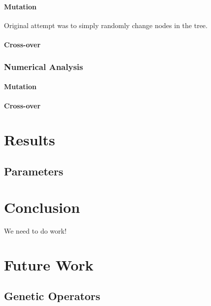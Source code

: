 \documentclass{acm_proc_article-sp}
\begin{document}
            \paragraph{Mutation}
            
            Original attempt was to simply randomly change nodes in the tree.
            
            \paragraph{Cross-over}
            
        \subsubsection{Numerical Analysis}
        
            \paragraph{Mutation}
            \paragraph{Cross-over}
            
\section{Results}
    
    \subsection{Parameters}

\section{Conclusion}

	We need to do work!
    
\section{Future Work}

    \subsection{Genetic Operators}


%

\end{document}
